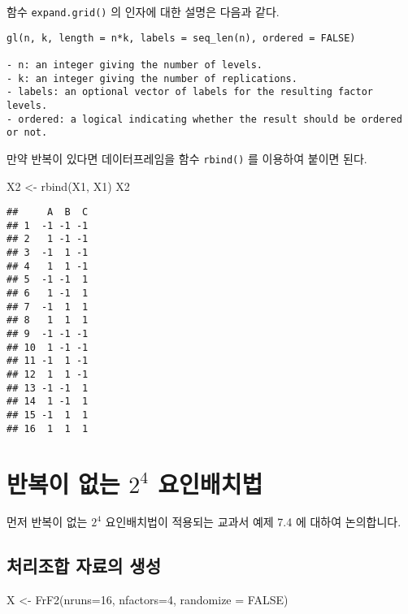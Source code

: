 \documentclass[
]{book}
\newenvironment{Shaded}{\begin{snugshade}}{\end{snugshade}}
\newcommand{\AttributeTok}[1]{\textcolor[rgb]{0.77,0.63,0.00}{#1}}
\newcommand{\ConstantTok}[1]{\textcolor[rgb]{0.00,0.00,0.00}{#1}}
\newcommand{\DecValTok}[1]{\textcolor[rgb]{0.00,0.00,0.81}{#1}}
\newcommand{\FunctionTok}[1]{\textcolor[rgb]{0.00,0.00,0.00}{#1}}
\newcommand{\NormalTok}[1]{#1}
\newcommand{\OtherTok}[1]{\textcolor[rgb]{0.56,0.35,0.01}{#1}}
\begin{document}
함수 \texttt{expand.grid()} 의 인자에 대한 설명은 다음과 같다.

\begin{verbatim}
gl(n, k, length = n*k, labels = seq_len(n), ordered = FALSE)

- n: an integer giving the number of levels.
- k: an integer giving the number of replications.
- labels: an optional vector of labels for the resulting factor levels.
- ordered: a logical indicating whether the result should be ordered or not.
\end{verbatim}

만약 반복이 있다면 데이터프레임을 함수 \texttt{rbind()} 를 이용하여 붙이면 된다.

\begin{Shaded}
\begin{Highlighting}[]
\NormalTok{X2 }\OtherTok{\textless{}{-}} \FunctionTok{rbind}\NormalTok{(X1, X1)}
\NormalTok{X2}
\end{Highlighting}
\end{Shaded}

\begin{verbatim}
##     A  B  C
## 1  -1 -1 -1
## 2   1 -1 -1
## 3  -1  1 -1
## 4   1  1 -1
## 5  -1 -1  1
## 6   1 -1  1
## 7  -1  1  1
## 8   1  1  1
## 9  -1 -1 -1
## 10  1 -1 -1
## 11 -1  1 -1
## 12  1  1 -1
## 13 -1 -1  1
## 14  1 -1  1
## 15 -1  1  1
## 16  1  1  1
\end{verbatim}

\hypertarget{fourfactor}{%
\chapter{\texorpdfstring{반복이 없는 \(2^4\) 요인배치법}{반복이 없는 2\^{}4 요인배치법}}\label{fourfactor}}

먼저 반복이 없는 \(2^4\) 요인배치법이 적용되는 교과서 예제 7.4 에 대하여 논의합니다.

\hypertarget{uxcc98uxb9acuxc870uxd569-uxc790uxb8ccuxc758-uxc0dduxc131-1}{%
\section{처리조합 자료의 생성}\label{uxcc98uxb9acuxc870uxd569-uxc790uxb8ccuxc758-uxc0dduxc131-1}}

\begin{Shaded}
\begin{Highlighting}[]
\NormalTok{X }\OtherTok{\textless{}{-}} \FunctionTok{FrF2}\NormalTok{(}\AttributeTok{nruns=}\DecValTok{16}\NormalTok{, }\AttributeTok{nfactors=}\DecValTok{4}\NormalTok{, }\AttributeTok{randomize =} \ConstantTok{FALSE}\NormalTok{)}
\end{Highlighting}
\end{Shaded}
\end{document}
